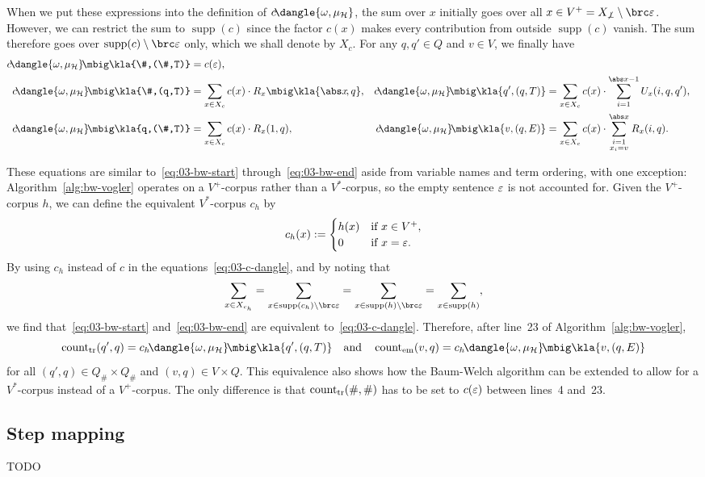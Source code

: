 When we put these expressions into the definition of
$c\!\dangle{\omega,\mu_\uh}$, the sum over $x$ initially goes over all $x\in
V^+ = X_{\not\bot}\setminus\brc\eps$. However, we can restrict the sum to
$\operatorname{supp}(c)$ since the factor $c(x)$ makes every contribution from
outside $\operatorname{supp}(c)$ vanish. The sum therefore goes over
$\operatorname{supp}(c)\setminus\brc\eps$ only, which we shall denote by $X_c$.
For any $q,q'\in Q$ and $v\in V$, we finally have
\begin{align}\label{eq:03-c-dangle}
 c\!\dangle{\omega,\mu_\uh}\!\mbig\kla{\#,(\#,T)} &= c(\eps), \\
 c\!\dangle{\omega,\mu_\uh}\!\mbig\kla{\#,(q,T)} &= \sum_{x\in X_c} c(x) \cdot R_x\mbig\kla{\abs x\!,q}, &
 c\!\dangle{\omega,\mu_\uh}\!\mbig\kla{q',(q,T)} &= \sum_{x\in X_c} c(x) \cdot \sum_{i=1}^{\abs x-1} U_x(i,q,q'), \nonumber\\
 c\!\dangle{\omega,\mu_\uh}\!\mbig\kla{q,(\#,T)} &= \sum_{x\in X_c} c(x) \cdot R_x(1,q), &
 c\!\dangle{\omega,\mu_\uh}\!\mbig\kla{v,(q,E)} &= \sum_{x\in X_c} c(x) \cdot \sum_{{\scriptstyle i=1}\atop{\scriptstyle x_i=v}}^{\abs x} R_x(i,q). \nonumber
\end{align}

These equations are similar to~\eqref{eq:03-bw-start}
through~\eqref{eq:03-bw-end} aside from variable names and term ordering, with
one exception: Algorithm~\ref{alg:bw-vogler} operates on a $V^+$-corpus rather
than a $V^*$-corpus, so the empty sentence $\varepsilon$ is not accounted for. Given
the $V^+$-corpus $h$, we can define the equivalent $V^*$-corpus $c_h$ by
\[
 c_h(x) := \begin{cases}
  h(x) &\text{if } x\in V^+, \\
  0 & \text{if } x=\varepsilon.
 \end{cases}
\]
By using $c_h$ instead of $c$ in the equations~\eqref{eq:03-c-dangle}, and by noting that
\[
 \sum_{x\in X_{c_h}} = \sum_{x\in \operatorname{supp}(c_h)\setminus\brc\eps} = \sum_{x\in\operatorname{supp}(h)\setminus\brc\eps} = \sum_{x\in\operatorname{supp}(h)},
\]
we find that~\eqref{eq:03-bw-start} and~\eqref{eq:03-bw-end} are equivalent
to~\eqref{eq:03-c-dangle}. Therefore, after line~23 of
Algorithm~\ref{alg:bw-vogler},
\[
 \cnt_\mathrm{tr}(q',q) = c_h\!\dangle{\omega,\mu_\uh}\!\mbig\kla{q',(q,T)}
 \quad\text{and}\quad
 \cnt_\mathrm{em}(v,q) = c_h\!\dangle{\omega,\mu_\uh}\!\mbig\kla{v,(q,E)}
\]
for all $(q',q)\in Q_\#\times Q_\#$ and $(v,q)\in V\times Q$. This equivalence
also shows how the Baum-Welch algorithm can be extended to allow for a
$V^*$-corpus instead of a $V^+$-corpus. The only difference is that
$\operatorname{count}_\mathrm{tr}(\#,\#)$ has to be set to $c(\varepsilon)$ between lines~4 and~23.

\subsection{Step mapping}

{\color{red}TODO}
